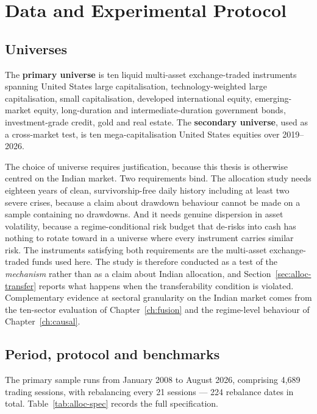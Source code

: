 \section{Data and Experimental Protocol}
\label{sec:alloc-setup}

\subsection{Universes}

The \textbf{primary universe} is ten liquid multi-asset exchange-traded instruments spanning
United States large capitalisation, technology-weighted large capitalisation, small
capitalisation, developed international equity, emerging-market equity, long-duration and
intermediate-duration government bonds, investment-grade credit, gold and real estate. The
\textbf{secondary universe}, used as a cross-market test, is ten mega-capitalisation United States
equities over 2019--2026.

The choice of universe requires justification, because this thesis is otherwise centred on the
Indian market. Two requirements bind. The allocation study needs eighteen years of clean,
survivorship-free daily history including at least two severe crises, because a claim about
drawdown behaviour cannot be made on a sample containing no drawdowns. And it needs genuine
dispersion in asset volatility, because a regime-conditional risk budget that de-risks into cash
has nothing to rotate toward in a universe where every instrument carries similar risk. The
instruments satisfying both requirements are the multi-asset exchange-traded funds used here. The
study is therefore conducted as a test of the \emph{mechanism} rather than as a claim about Indian
allocation, and Section~\ref{sec:alloc-transfer} reports what happens when the transferability
condition is violated. Complementary evidence at sectoral granularity on the Indian market comes
from the ten-sector evaluation of Chapter~\ref{ch:fusion} and the regime-level behaviour of
Chapter~\ref{ch:causal}.

\subsection{Period, protocol and benchmarks}

The primary sample runs from January 2008 to August 2026, comprising 4,689 trading sessions, with
rebalancing every 21 sessions --- 224 rebalance dates in total. Table~\ref{tab:alloc-spec} records
the full specification.


